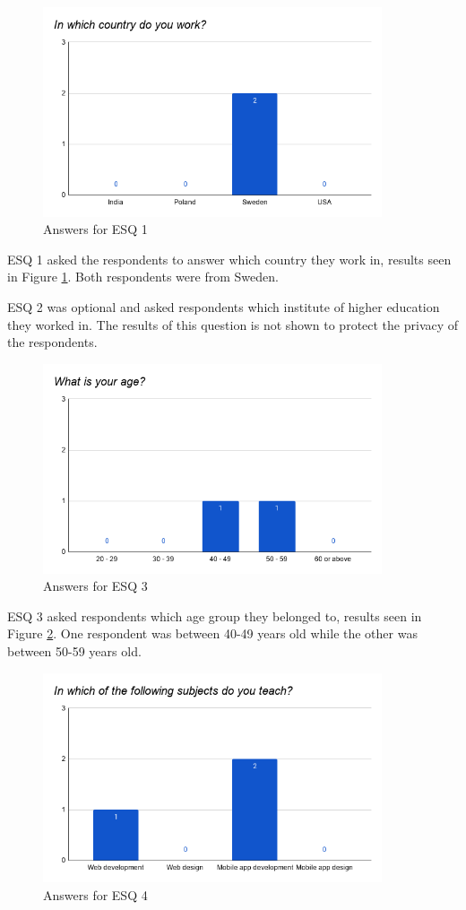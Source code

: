 \documentclass[a4paper,12pt]{article}
\begin{document}
\begin{figure}[ht!]
    \centering
    \includegraphics[width=10cm]{img/Results/esq1.png}
    \caption{Answers for ESQ 1}
    \label{fig:res_eduq1}
\end{figure}
\newpage
ESQ 1 asked the respondents to answer which country they work in, results seen in Figure \ref{fig:res_eduq1}. Both respondents were from Sweden.

ESQ 2 was optional and asked respondents which institute of higher education they worked in. The results of this question is not shown to protect the privacy of the respondents.

\begin{figure}[ht!]
    \centering
    \includegraphics[width=10cm]{img/Results/esq3.png}
    \caption{Answers for ESQ 3}
    \label{fig:res_eduq3}
\end{figure}

ESQ 3 asked respondents which age group they belonged to, results seen in Figure \ref{fig:res_eduq3}. One respondent was between 40-49 years old while the other was between 50-59 years old.
\newpage

\begin{figure}[ht!]
    \centering
    \includegraphics[width=10cm]{img/Results/esq4.png}
    \caption{Answers for ESQ 4}
    \label{fig:res_eduq4}
\end{figure}
\end{document}

